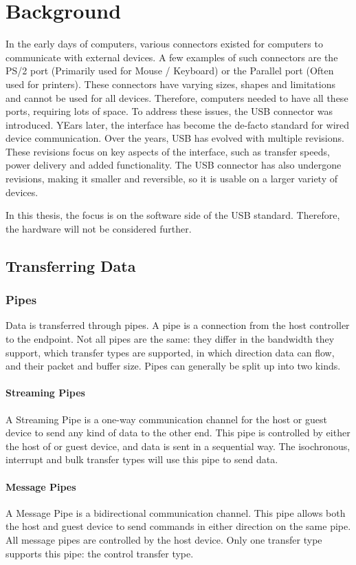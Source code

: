 \chapter{Background}
\label{chap:rel_work}
In the early days of computers, various connectors existed for computers to communicate with external devices. A few examples of such connectors are the PS/2 port (Primarily used for Mouse / Keyboard) or the Parallel port (Often used for printers). These connectors have varying sizes, shapes and limitations and cannot be used for all devices. Therefore, computers needed to have all these ports, requiring lots of space. To address these issues, the USB connector was introduced. YEars later, the interface has become the de-facto standard for wired device communication. Over the years, USB has evolved with multiple revisions. These revisions focus on key aspects of the interface, such as transfer speeds, power delivery and added functionality. The USB connector has also undergone revisions, making it smaller and reversible, so it is usable on a larger variety of devices.

In this thesis, the focus is on the software side of the USB standard. Therefore, the hardware will not be considered further.

\section{Transferring Data}
\subsection{Pipes}
Data is transferred through pipes. A pipe is a connection from the host controller to the endpoint. Not all pipes are the same: they differ in the bandwidth they support, which transfer types are supported, in which direction data can flow, and their packet and buffer size. Pipes can generally be split up into two kinds.

\subsubsection{Streaming Pipes}
A Streaming Pipe is a one-way communication channel for the host or guest device to send any kind of data to the other end. This pipe is controlled by either the host of or guest device, and data is sent in a sequential way. The isochronous, interrupt and bulk transfer types will use this pipe to send data.

\subsubsection{Message Pipes}
A Message Pipe is a bidirectional communication channel. This pipe allows both the host and guest device to send commands in either direction on the same pipe. All message pipes are controlled by the host device. Only one transfer type supports this pipe: the control transfer type.

